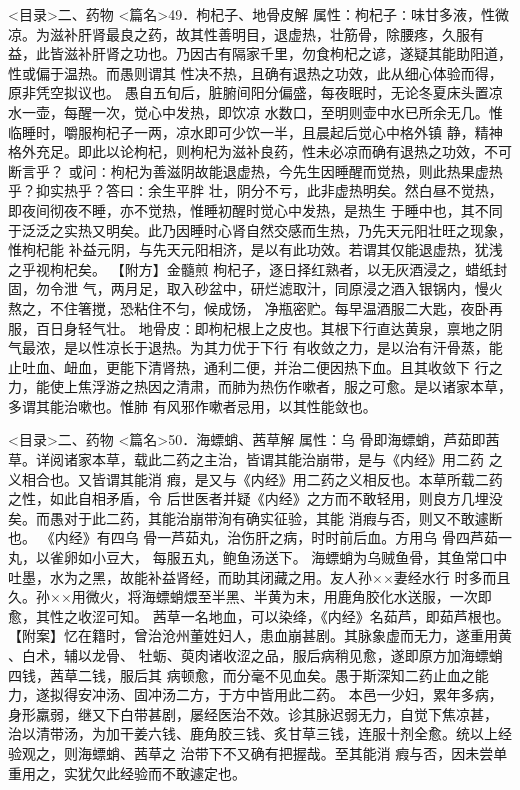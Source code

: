 \documentclass[a4paper,12pt,UTF8,twoside]{ctexbook}
\begin{document}
<目录>二、药物
<篇名>49．枸杞子、地骨皮解
属性：枸杞子∶味甘多液，性微凉。为滋补肝肾最良之药，故其性善明目，退虚热，壮筋骨，除腰疼，久服有 
益，此皆滋补肝肾之功也。乃因古有隔家千里，勿食枸杞之谚，遂疑其能助阳道，性或偏于温热。而愚则谓其 
性决不热，且确有退热之功效，此从细心体验而得，原非凭空拟议也。 
愚自五旬后，脏腑间阳分偏盛，每夜眠时，无论冬夏床头置凉水一壶，每醒一次，觉心中发热，即饮凉 
水数口，至明则壶中水已所余无几。惟临睡时，嚼服枸杞子一两，凉水即可少饮一半，且晨起后觉心中格外镇 
静，精神格外充足。即此以论枸杞，则枸杞为滋补良药，性未必凉而确有退热之功效，不可断言乎？ 
或问∶枸杞为善滋阴故能退虚热，今先生因睡醒而觉热，则此热果虚热乎？抑实热乎？答曰∶余生平胖 
壮，阴分不亏，此非虚热明矣。然白昼不觉热，即夜间彻夜不睡，亦不觉热，惟睡初醒时觉心中发热，是热生 
于睡中也，其不同于泛泛之实热又明矣。此乃因睡时心肾自然交感而生热，乃先天元阳壮旺之现象，惟枸杞能 
补益元阴，与先天元阳相济，是以有此功效。若谓其仅能退虚热，犹浅之乎视枸杞矣。 
【附方】金髓煎 
枸杞子，逐日择红熟者，以无灰酒浸之，蜡纸封固，勿令泄 
气，两月足，取入砂盆中，研烂滤取汁，同原浸之酒入银锅内，慢火熬之，不住箸搅，恐粘住不匀，候成饧， 
净瓶密贮。每早温酒服二大匙，夜卧再服，百日身轻气壮。 
地骨皮∶即枸杞根上之皮也。其根下行直达黄泉，禀地之阴气最浓，是以性凉长于退热。为其力优于下行 
有收敛之力，是以治有汗骨蒸，能止吐血、衄血，更能下清肾热，通利二便，并治二便因热下血。且其收敛下 
行之力，能使上焦浮游之热因之清肃，而肺为热伤作嗽者，服之可愈。是以诸家本草，多谓其能治嗽也。惟肺 
有风邪作嗽者忌用，以其性能敛也。 

<目录>二、药物
<篇名>50．海螵蛸、茜草解
属性：乌 骨即海螵蛸，芦茹即茜草。详阅诸家本草，载此二药之主治，皆谓其能治崩带，是与《内经》用二药 
之义相合也。又皆谓其能消 瘕，是又与《内经》用二药之义相反也。本草所载二药之性，如此自相矛盾，令 
后世医者并疑《内经》之方而不敢轻用，则良方几埋没矣。而愚对于此二药，其能治崩带洵有确实征验，其能 
消瘕与否，则又不敢遽断也。 
《内经》有四乌 骨一芦茹丸，治伤肝之病，时时前后血。方用乌 骨四芦茹一丸，以雀卵如小豆大， 
每服五丸，鲍鱼汤送下。 
海螵蛸为乌贼鱼骨，其鱼常口中吐墨，水为之黑，故能补益肾经，而助其闭藏之用。友人孙××妻经水行 
时多而且久。孙××用微火，将海螵蛸煨至半黑、半黄为末，用鹿角胶化水送服，一次即愈，其性之收涩可知。 
茜草一名地血，可以染绛，《内经》名茹芦，即茹芦根也。 
【附案】忆在籍时，曾治沧州董姓妇人，患血崩甚剧。其脉象虚而无力，遂重用黄 、白术，辅以龙骨、 
牡蛎、萸肉诸收涩之品，服后病稍见愈，遂即原方加海螵蛸四钱，茜草二钱，服后其 
病顿愈，而分毫不见血矣。愚于斯深知二药止血之能力，遂拟得安冲汤、固冲汤二方，于方中皆用此二药。 
本邑一少妇，累年多病，身形羸弱，继又下白带甚剧，屡经医治不效。诊其脉迟弱无力，自觉下焦凉甚， 
治以清带汤，为加干姜六钱、鹿角胶三钱、炙甘草三钱，连服十剂全愈。统以上经验观之，则海螵蛸、茜草之 
治带下不又确有把握哉。至其能消 瘕与否，因未尝单重用之，实犹欠此经验而不敢遽定也。 
\end{document}
